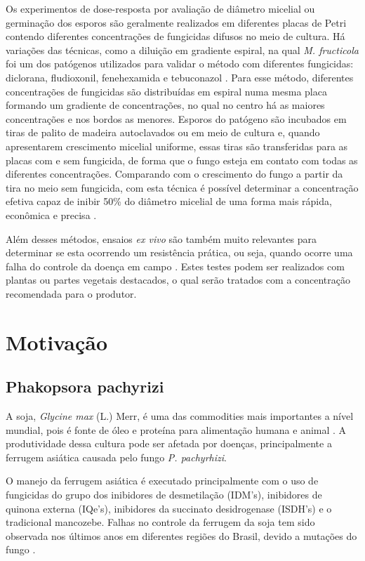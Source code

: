 \documentclass[a4paper,]{book}
\begin{document}
Os experimentos de dose-resposta por avaliação de diâmetro micelial ou
germinação dos esporos são geralmente realizados em diferentes placas de
Petri contendo diferentes concentrações de fungicidas difusos no meio de
cultura. Há variações das técnicas, como a diluição em gradiente
espiral, na qual \emph{M. fructicola} foi um dos patógenos utilizados
para validar o método com diferentes fungicidas: diclorana, fludioxonil,
fenehexamida e tebuconazol \citep{forster2004}. Para esse método,
diferentes concentrações de fungicidas são distribuídas em espiral numa
mesma placa formando um gradiente de concentrações, no qual no centro há
as maiores concentrações e nos bordos as menores. Esporos do patógeno
são incubados em tiras de palito de madeira autoclavados ou em meio de
cultura e, quando apresentarem crescimento micelial uniforme, essas
tiras são transferidas para as placas com e sem fungicida, de forma que
o fungo esteja em contato com todas as diferentes concentrações.
Comparando com o crescimento do fungo a partir da tira no meio sem
fungicida, com esta técnica é possível determinar a concentração efetiva
capaz de inibir 50\% do diâmetro micelial de uma forma mais rápida,
econômica e precisa \citep{forster2004, amiri2014}.

Além desses métodos, ensaios \emph{ex vivo} são também muito relevantes
para determinar se esta ocorrendo um resistência prática, ou seja,
quando ocorre uma falha do controle da doença em campo
\citep{ghinirekimatih2000}. Estes testes podem ser realizados com
plantas ou partes vegetais destacados, o qual serão tratados com a
concentração recomendada para o produtor.

\chapter{Motivação}\label{motivacao-1}

\section{Phakopsora pachyrizi}\label{phakopsora-pachyrizi}

A soja, \emph{Glycine max} (L.) Merr, é uma das commodities mais
importantes a nível mundial, pois é fonte de óleo e proteína para
alimentação humana e animal \citep{conab}. A produtividade dessa cultura
pode ser afetada por doenças, principalmente a ferrugem asiática causada
pelo fungo \emph{P. pachyrhizi}.

O manejo da ferrugem asiática é executado principalmente com o uso de
fungicidas do grupo dos inibidores de desmetilação (IDM's), inibidores
de quinona externa (IQe's), inibidores da succinato desidrogenase
(ISDH's) e o tradicional mancozebe. Falhas no controle da ferrugem da
soja tem sido observada nos últimos anos em diferentes regiões do
Brasil, devido a mutações do fungo \citep{godoy2019}.
\end{document}
